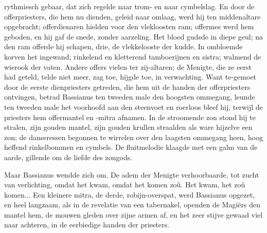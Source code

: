 \documentclass[a4paper, 12pt, oneside, dutch]{article}
\begin{document}
rythmiesch gebaar, dat zich regelde naar trom- en naar cymbelslag. En door de offerpriesters, die hem nu dienden, geleid naar omlaag, werd hij ten middenaltare opgebracht; offerdienaren hielden voor den vlekloosten ram; offermes werd hem geboden, en hij gaf de snede, zonder aarzeling. Het bloed gudsde in diepe geul; na den ram offerde hij schapen, drie, de vlekkelooste der kudde. In ombloemde korven het ingewand; rinkelend en kletterend tamboerijnen en sistra; walmend de wierook der vaten. Andere offers vielen ter zij-altaren; de Menigte, die ze eerst had geteld, telde niet meer, zag toe, hijgde toe, in verwachting. Want te-gemoet door de eerste dienpriesters getreden, die hem uit de handen der offerpriesters ontvingen, betrad Bassianus ten tweeden male den hoogsten ommegang, leunde ten tweeden male het voorhoofd aan den steenvoet en roerloos bleef hij, terwijl de priesters hem offermantel en -mitra afnamen. In de stroomende zon stond hij te stralen, zijn gouden mantel, zijn gouden krullen straalden als ware hijzelve een zon; de danseressen begonnen te wirrelen over den laagsten ommegang heen, hoog heffend rinkelbommen en cymbels. De fluitmelodie klaagde met een galm van de aarde, gillende om de liefde des zongods.

Maar Bassianus wendde zich om. De adem der Menigte verhoorbaarde, tot zucht van verlichting, omdat het kwam, omdat het komen zoû. Het kwam, het zoû komen... Een kleinere mitra, de derde, robijn-overspat, werd Bassianus opgezet, en heel langzaam, als in de revelatie van een tabernakel, openden de Magiërs den mantel hem, de mouwen gleden over zijne armen af, en het zeer stijve gewaad viel naar achteren, in de eerbiedige handen der priesters.
\end{document}
